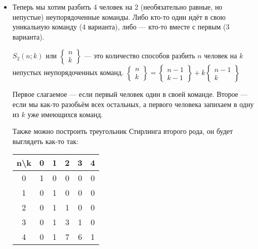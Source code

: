 \documentclass{article}
\begin{document}
    \begin{itemize}
        \item[]
        \begin{Comment}
            Теперь мы хотим разбить 4 человек на 2 (необязательно равные, но непустые) неупорядоченные команды. Либо кто-то один идёт в свою уникальную команду (4 варианта), либо --- кто-то вместе с первым (3 варианта).
        \end{Comment}
        \dfn {} $S_2(n;k)$ или $\left\{\begin{matrix}n\\k\end{matrix}\right\}$ --- это количество способов разбить $n$ человек на $k$ непустых неупорядоченных команд.
        \thm $\left\{\begin{matrix}n\\k\end{matrix}\right\}=\left\{\begin{matrix}n-1\\k-1\end{matrix}\right\}+k\left\{\begin{matrix}n-1\\k\end{matrix}\right\}$
        \begin{Proof}
            Первое слагаемое --- если первый человек один в своей команде. Второе --- если мы как-то разобьём всех остальных, а первого человека запихаем в одну из $k$ уже имеющихся команд.
        \end{Proof}
        \begin{Comment}
            Также можно построить треугольник Стирлинга второго рода, он будет выглядеть как-то так:
            \begin{center}
                \begin{tabular}{|c|ccccc|}
                    \hline
                    n\textbackslash k & 0 & 1 & 2 & 3 & 4\\
                    \hline
                    0 & 1 & 0 & 0 & 0 & 0\\
                    1 & 0 & 1 & 0 & 0 & 0\\
                    2 & 0 & 1 & 1 & 0 & 0\\
                    3 & 0 & 1 & 3 & 1 & 0\\
                    4 & 0 & 1 & 7 & 6 & 1\\
                    \hline
                \end{tabular}

\end{center}
\end{Comment}
\end{itemize}
\end{document}
